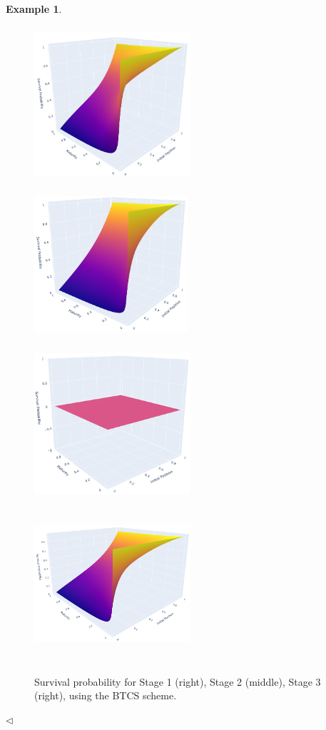 \documentclass[11pt,reqno]{article}
\theoremstyle{definition}
\newtheorem{example}[theorem]{Example}
\begin{document}
\begin{example}
\begin{figure}[h]
	\begin{center}
		\includegraphics[height=58mm, width=58mm,scale=0.3]{PD_example_5_5_1.png}
		\includegraphics[height=58mm, width=57mm, scale=0.3]{PD_example_5_5_2.png}
		\includegraphics[height=58mm, width=58mm, scale=0.3]{PD_example_5_5_3.png}
		\includegraphics[height=58mm, width=58mm, scale=0.3]{PD_example_5_5_av.png}
	\end{center}
	\caption{Survival probability for Stage 1 (right), Stage 2 (middle), Stage 3 (right), using the BTCS scheme.}
	\label{graphs_rs}
\end{figure}
\end{example}\hfill $\triangleleft$
\end{document}
